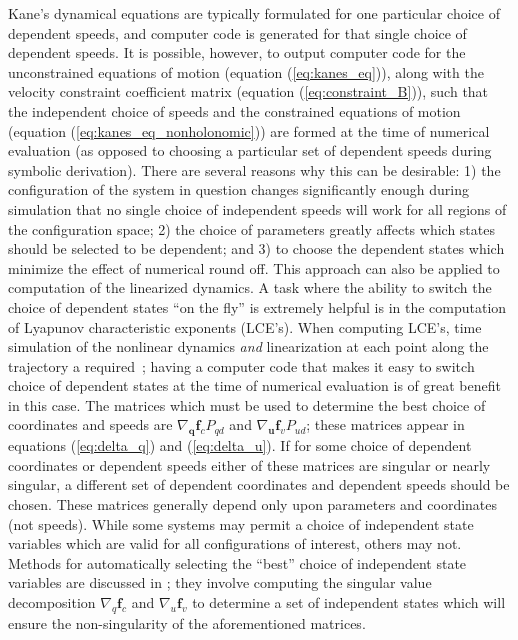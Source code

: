 \documentclass[smallcondensed,final]{svjour3}                     %
\begin{document}
Kane's dynamical equations are typically formulated for one particular choice
of dependent speeds, and computer code is generated for that single choice of
dependent speeds. It is possible, however, to output computer code for the
unconstrained equations of motion (equation (\ref{eq:kanes_eq})), along with
the velocity constraint coefficient matrix (equation (\ref{eq:constraint_B})),
such that the independent choice of speeds and the constrained equations of
motion (equation (\ref{eq:kanes_eq_nonholonomic})) are formed at the time of
numerical evaluation (as opposed to choosing a particular set of dependent
speeds during symbolic derivation). There are several reasons why this can be
desirable: 1) the configuration of the system in question changes significantly
enough during simulation that no single choice of independent speeds will work
for all regions of the configuration space; 2) the choice of parameters greatly
affects which states should be selected to be dependent; and 3) to choose the
dependent states which minimize the effect of numerical round off. This
approach can also be applied to computation of the linearized dynamics. A task
where the ability to switch the choice of dependent states ``on the fly'' is
extremely helpful is in the computation of Lyapunov characteristic exponents
(LCE's). When computing LCE's, time simulation of the nonlinear dynamics
\textit{and} linearization at each point along the trajectory a
required~\cite{Benettin1980a,Benettin1980b,Udwadia2001};
having a computer code that makes it easy to switch choice of dependent states
at the time of numerical evaluation is of great benefit in this case. The
matrices which must be used to determine the best choice of coordinates and
speeds are $\nabla_{\bm{q}} \bm{f}_c P_{qd}$ and $\nabla_{\bm{u}} \bm{f}_v P_{ud}$;
these matrices appear in equations (\ref{eq:delta_q}) and (\ref{eq:delta_u}).
If for some choice of dependent coordinates or dependent speeds either of these
matrices are singular or nearly singular, a different set of dependent
coordinates and dependent speeds should be chosen. These matrices generally
depend only upon parameters and coordinates (not speeds). While some systems
may permit a choice of independent state variables which are valid for all
configurations of interest, others may not. Methods for automatically selecting
the ``best'' choice of independent state variables are discussed in
\cite{Reckdahl1996}; they involve computing the singular value decomposition
$\nabla_q \bm{f}_c$ and $\nabla_u \bm{f}_v$  to determine a set of independent
states which will ensure the non-singularity of the aforementioned matrices.
\end{document}
